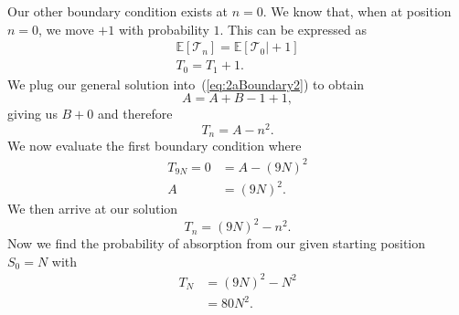 \documentclass{article}
\newcommand{\E}{\mathbb{E}}
\begin{document}
Our other boundary condition exists at $n=0$. We know that, when at position $n=0$, we move $+1$ with probability $1$. This can be expressed as
\begin{align}
    \E[\mathcal{T}_n]=\E[\mathcal{T}_0\vert+1] \\
    T_0 = T_1 + 1. \label{eq:2aBoundary2}
\end{align}
We plug our general solution into~(\ref{eq:2aBoundary2}) to obtain
\begin{equation}
    A=A+B-1+1,
\end{equation}
giving us $B+0$ and therefore 
\begin{equation}
    T_n = A-n^2.
\end{equation}
We now evaluate the first boundary condition where
\begin{align}
    T_{9N} = 0 &= A - (9N)^2\\
    A &= (9N)^2.
\end{align}
We then arrive at our solution
\begin{equation}
    T_n = (9N)^2-n^2.
\end{equation}
Now we find the probability of absorption from our given starting position $S_0 = N$ with
\begin{align}
    T_N &= (9N)^2 - N^2 \\
    &= 80N^2.
\end{align}
\end{document}
